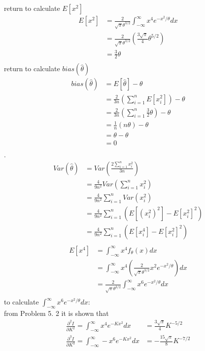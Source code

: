 \documentclass[12pt,border=4pt,multi]{article} %
\begin{document}
return to calculate $E[x^2]$
\begin{align*}
E[x^2] &= \frac{2}{\sqrt{\pi}\theta^{3 / 2}} \int_{-\infty}^{\infty} x^4 e^{-x^2 / \theta} dx\\
&= \frac{2}{\sqrt{\pi}\theta^{3 / 2}} \left(\frac{3\sqrt{\pi}}{4}\theta^{5 / 2}\right)\\
&= \frac{3}{2}\theta\\
\end{align*}
return to calculate $bias(\hat{\theta})$
\begin{align*}
bias(\hat{\theta}) &= E[\hat{\theta}] - \theta\\
&= \frac{2}{3n}\left(\sum_{i = 1}^n E[x_i^2]\right) - \theta\\
&= \frac{2}{3n}\left(\sum_{i = 1}^n \frac{3}{2}\theta\right) - \theta\\
&= \frac{1}{n}(n\theta) - \theta\\
&= \theta - \theta\\
&= \boxed{0}\\
\end{align*}
\newpage
{}.
\begin{align*}
Var(\hat{\theta}) &= Var\left(\frac{2\sum_{i = 1}^n x_i^2}{3n}\right)\\
&= \frac{4}{9n^2}Var(\sum_{i = 1}^n x_i^2)\\
&= \frac{4}{9n^2}\sum_{i = 1}^n Var(x_i^2)\\
&= \frac{4}{9n^2}\sum_{i = 1}^n \left(E[(x_i^2)^2] - E[x_i^2]^2\right)\\
&= \frac{4}{9n^2}\sum_{i = 1}^n \left(E[x_i^4] - E[x_i^2]^2\right)\\
\end{align*}
\begin{align*}
E[x^4] &= \int_{-\infty}^{\infty} x^4 f_\theta(x) dx\\
&= \int_{-\infty}^{\infty} x^4 \left(\frac{2}{\sqrt{\pi}\theta^{3 / 2}} x^2 e^{-x^2 / \theta}\right) dx\\
&= \frac{2}{\sqrt{\pi}\theta^{3 / 2}} \int_{-\infty}^{\infty} x^6 e^{-x^2 / \theta} dx\\
\end{align*}
to calculate $\int_{-\infty}^{\infty} x^6 e^{-x^2 / \theta} dx$:\\
from Problem 5. 2 it is shown that 
\begin{align*}
\frac{\partial^2 I}{\partial K^2} = \int_{-\infty}^{\infty} x^4 e^{-Kx^2} dx &= \frac{3\sqrt{\pi}}{4}K^{-5 / 2}\\
\frac{\partial^3 I}{\partial K^3} = \int_{-\infty}^{\infty} -x^6 e^{-Kx^2} dx &= -\frac{15\sqrt{\pi}}{8}K^{-7 / 2}\\
\end{align*}
\end{document}
